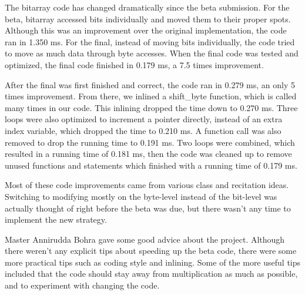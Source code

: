\documentclass[12pt]{article}
\begin{document}
\maketitle

The bitarray code has changed dramatically since the beta submission.  For the 
beta, bitarray accessed bits individually and moved them to their proper spots.  
Although this was an improvement over the original implementation, the code ran
in 1.350 ms.  For the final, instead of moving bits individually, the code tried 
to move as much data through byte accesses.  When the final code was tested and 
optimized, 
the final code finished in 0.179 ms, a 7.5 times improvement.  

After the final was first finished and correct, the code ran in 0.279 ms, an 
only 5 times improvement.  From there, we inlined a shift_byte function, which is 
called many times in our code.  This inlining dropped the time down to 0.270 ms.  
Three loops were also optimized to increment a pointer directly, instead of an extra
index variable, which dropped the time to 0.210 ms.  A function call was also 
removed to drop the running time to 0.191 ms.  Two loops were combined, which 
resulted in a running time of 0.181 ms, then the code was cleaned up to remove
unused functions and statements which finished with a running time of 0.179 ms.  

Most of these code improvements came from various class and recitation ideas.  
Switching to modifying mostly on the byte-level instead of the bit-level was actually 
thought of right before the beta was due, but there wasn't any time to implement 
the new strategy.  

Master Annirudda Bohra gave some good advice about the project.  Although there 
weren't any explicit tips about speeding up the beta code, there were some 
more practical tips such as coding style and inlining.  Some of the more useful 
tips included that the code should stay away from multiplication as much as possible, 
and to experiment with changing the code.  
\end{document}
